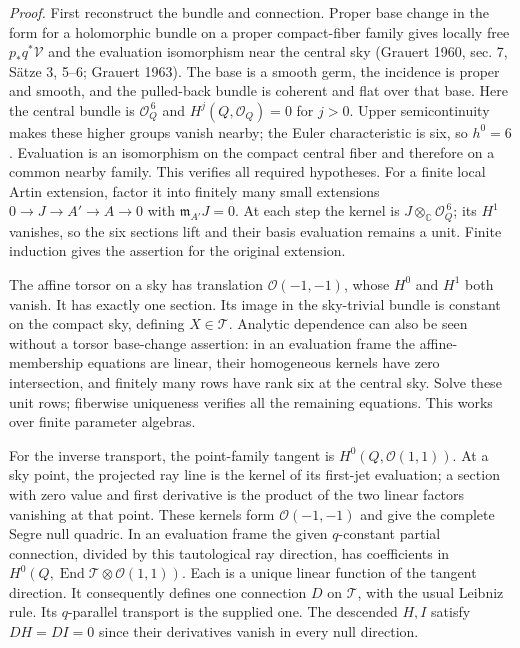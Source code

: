 \documentclass[
  english,
  11pt,
  reqno]{amsart}
\begin{document}
\emph{Proof.} First reconstruct the bundle and connection. Proper base
change in the form for a holomorphic bundle on a proper compact-fiber
family gives locally free \(p_*q^*\mathcal V\) and the evaluation
isomorphism near the central sky (Grauert 1960, sec. 7, Sätze 3, 5--6;
Grauert 1963). The base is a smooth germ, the incidence is proper and
smooth, and the pulled-back bundle is coherent and flat over that base.
Here the central bundle is \(\mathcal O_Q^{\,6}\) and
\(H^j(Q,\mathcal O_Q)=0\) for \(j>0\). Upper semicontinuity makes these
higher groups vanish nearby; the Euler characteristic is six, so
\(h^0=6\). Evaluation is an isomorphism on the compact central fiber and
therefore on a common nearby family. This verifies all required
hypotheses. For a finite local Artin extension, factor it into finitely
many small extensions \(0\to J\to A'\to A\to0\) with
\(\mathfrak m_{A'}J=0\). At each step the kernel is
\(J\otimes_{\mathbb C}\mathcal O_Q^{\,6}\); its \(H^1\) vanishes, so the
six sections lift and their basis evaluation remains a unit. Finite
induction gives the assertion for the original extension.

The affine torsor on a sky has translation \(\mathcal O(-1,-1)\), whose
\(H^0\) and \(H^1\) both vanish. It has exactly one section. Its image
in the sky-trivial bundle is constant on the compact sky, defining
\(X\in\mathcal T\). Analytic dependence can also be seen without a
torsor base-change assertion: in an evaluation frame the
affine-membership equations are linear, their homogeneous kernels have
zero intersection, and finitely many rows have rank six at the central
sky. Solve these unit rows; fiberwise uniqueness verifies all the
remaining equations. This works over finite parameter algebras.

For the inverse transport, the point-family tangent is
\(H^0(Q,\mathcal O(1,1))\). At a sky point, the projected ray line is
the kernel of its first-jet evaluation; a section with zero value and
first derivative is the product of the two linear factors vanishing at
that point. These kernels form \(\mathcal O(-1,-1)\) and give the
complete Segre null quadric. In an evaluation frame the given
\(q\)-constant partial connection, divided by this tautological ray
direction, has coefficients in
\(H^0(Q,\operatorname{End}\mathcal T\otimes\mathcal O(1,1))\). Each is a
unique linear function of the tangent direction. It consequently defines
one connection \(D\) on \(\mathcal T\), with the usual Leibniz rule. Its
\(q\)-parallel transport is the supplied one. The descended \(H,I\)
satisfy \(DH=DI=0\) since their derivatives vanish in every null
direction.
\end{document}
